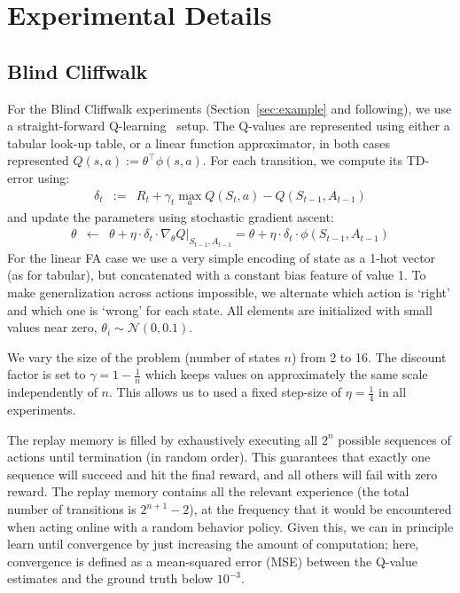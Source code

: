 \documentclass[a4paper]{article}
\begin{document}
\section{Experimental Details}

\subsection{Blind Cliffwalk}
\label{app-microzuma}

For the Blind Cliffwalk experiments (Section~\ref{sec:example} and following), we 
use a straight-forward Q-learning~\citep{q-learning} setup.
The Q-values are represented using either a tabular look-up table,
or a linear function approximator, in both cases represented $Q(s,a) := \theta^{\top} \phi(s, a)$.
For each transition, we compute its TD-error using:
\begin{eqnarray}
\label{eq-td-error}
\delta_t & := & R_t + \gamma_t \max_a Q(S_{t}, a) - Q(S_{t-1}, A_{t-1}) 
\end{eqnarray}
and update the parameters using stochastic gradient ascent:
\begin{eqnarray}
\label{eq-qlearning}
\theta & \leftarrow & \theta + \eta \cdot \delta_t \cdot \nabla_{\theta} Q\bigr|_{S_{t-1}, A_{t-1}} = \theta + \eta \cdot \delta_t \cdot \phi(S_{t-1}, A_{t-1})
\end{eqnarray}
For the linear FA case we use a very simple encoding of state as a 1-hot vector (as for tabular), but concatenated with a constant bias feature of value 1.
To make generalization across actions impossible, we alternate which action is `right' and which one is `wrong' for each state.
All elements are initialized with small values near zero, $\theta_i \sim \mathcal{N}(0, 0.1)$.

We vary the size of the problem (number of states $n$) from 2 to 16. 
The discount factor is set to $\gamma=1-\frac{1}{n}$ which keeps values on approximately the same scale independently of $n$.
This allows us to used a fixed step-size of $\eta=\frac{1}{4}$ in all experiments.

The replay memory is filled by exhaustively executing all $2^n$ possible sequences of actions until termination (in random order). 
This guarantees that exactly one sequence will succeed and hit the final reward, and all others will fail with zero reward.
The replay memory contains all the relevant experience (the total number of transitions is $2^{n+1}-2$), 
at the frequency that it would be encountered when acting online with a random behavior policy.
Given this, we can in principle learn until convergence by just increasing the amount of computation;
here, convergence is defined as a mean-squared error (MSE) between the Q-value estimates and the ground truth below $10^{-3}$.
\end{document}
